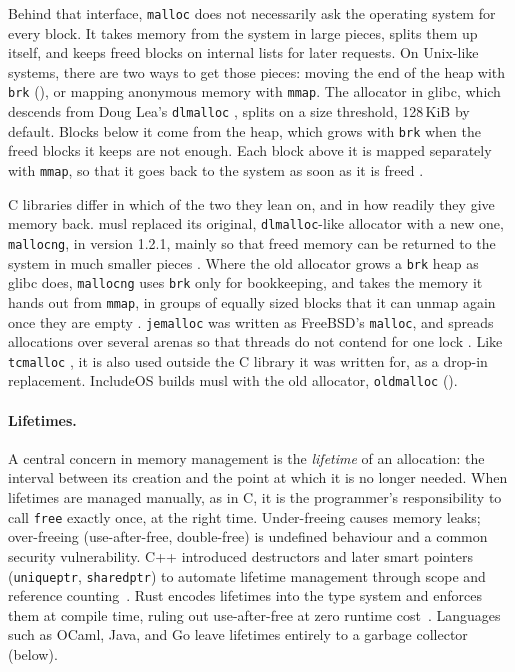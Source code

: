 \documentclass[12pt]{report}
\newcommand{\fullref}[1]{\Cref{#1}}
\renewcommand{\_}{\origunderscore\allowbreak}
\begin{document}
Behind that interface, \texttt{malloc} does not necessarily ask the operating system for every block. It takes memory from the system in large pieces, splits them up itself, and keeps freed blocks on internal lists for later requests. On Unix-like systems, there are two ways to get those pieces: moving the end of the heap with \texttt{brk} (\fullref{sec:posix}), or mapping anonymous memory with \texttt{mmap}. The allocator in glibc, which descends from Doug Lea's \texttt{dlmalloc} \cite{lea1996malloc}, splits on a size threshold, 128\,KiB by default. Blocks below it come from the heap, which grows with \texttt{brk} when the freed blocks it keeps are not enough. Each block above it is mapped separately with \texttt{mmap}, so that it goes back to the system as soon as it is freed \cite{linux-malloc-man}.

C libraries differ in which of the two they lean on, and in how readily they give memory back. musl replaced its original, \texttt{dlmalloc}-like allocator with a new one, \texttt{mallocng}, in version 1.2.1, mainly so that freed memory can be returned to the system in much smaller pieces \cite{musl-releases}. Where the old allocator grows a \texttt{brk} heap as glibc does, \texttt{mallocng} uses \texttt{brk} only for bookkeeping, and takes the memory it hands out from \texttt{mmap}, in groups of equally sized blocks that it can unmap again once they are empty \cite{musl-mallocng-source}. \texttt{jemalloc} was written as FreeBSD's \texttt{malloc}, and spreads allocations over several arenas so that threads do not contend for one lock \cite{evans2006jemalloc}. Like \texttt{tcmalloc} \cite{ghemawat2023tcmalloc}, it is also used outside the C library it was written for, as a drop-in replacement. IncludeOS builds musl with the old allocator, \texttt{oldmalloc} (\fullref{sec:restrictions}).

\paragraph{Lifetimes.} A central concern in memory management is the \emph{lifetime} of an allocation: the interval between its creation and the point at which it is no longer needed. When lifetimes are managed manually, as in C, it is the programmer's responsibility to call \texttt{free} exactly once, at the right time. Under-freeing causes memory leaks; over-freeing (use-after-free, double-free) is undefined behaviour and a common security vulnerability. C++ introduced destructors and later smart pointers (\texttt{unique\_ptr}, \texttt{shared\_ptr}) to automate lifetime management through scope and reference counting~\cite{stroustrup2013cpp}. Rust encodes lifetimes into the type system and enforces them at compile time, ruling out use-after-free at zero runtime cost~\cite{matsakis2014rust}. Languages such as OCaml, Java, and Go leave lifetimes entirely to a garbage collector (below).
\end{document}
